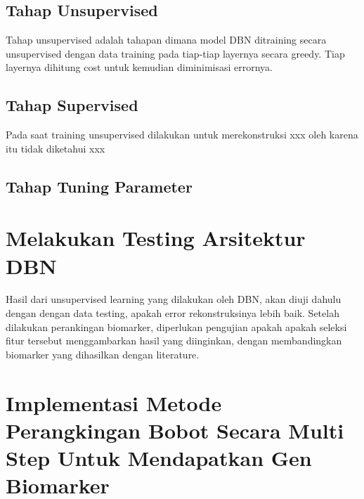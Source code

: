 \subsection{Tahap Unsupervised}
Tahap unsupervised adalah tahapan dimana model DBN ditraining secara unsupervised dengan data training pada tiap-tiap layernya secara greedy. Tiap layernya dihitung cost untuk kemudian diminimisasi errornya.

\subsection{Tahap Supervised}
Pada saat training unsupervised dilakukan untuk merekonstruksi xxx
oleh karena itu tidak diketahui xxx

\subsection{Tahap Tuning Parameter}


\section{Melakukan Testing Arsitektur DBN}
Hasil dari unsupervised learning yang dilakukan oleh DBN, akan diuji dahulu dengan dengan data testing, apakah error rekonstruksinya lebih baik. Setelah dilakukan perankingan biomarker, diperlukan pengujian apakah apakah seleksi fitur tersebut menggambarkan hasil yang diinginkan, dengan membandingkan biomarker yang dihasilkan dengan literature. 

\section{Implementasi Metode Perangkingan Bobot Secara Multi Step Untuk Mendapatkan Gen Biomarker}
\\

